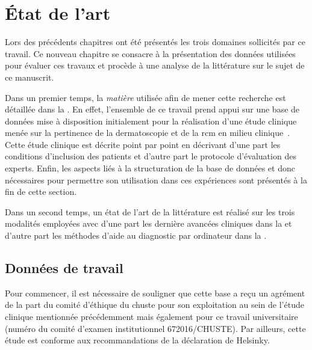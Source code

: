 \chapter{État de l'art}
\label{chap:chapter_31}
\chapterintro
Lors des précédents chapitres ont été présentés les trois domaines sollicités par ce travail. Ce nouveau chapitre se consacre à la présentation des données utilisées pour évaluer ces travaux et procède à une analyse de la littérature sur le sujet de ce manuscrit.\par

Dans un premier temps, la \textit{matière} utilisée afin de mener cette recherche est détaillée dans la . En effet, l'ensemble de ce travail prend appui sur une base de données mise à disposition initialement pour la réalisation d'une étude clinique menée sur la pertinence de la dermatoscopie et de la \acrlong{rcm} en milieu clinique~\cite{Cinotti2018}. Cette étude clinique est décrite point par point en décrivant d'une part les conditions d'inclusion des patients et d'autre part le protocole d'évaluation des experts. Enfin, les aspects liés à la structuration de la base de données et donc nécessaires pour permettre son utilisation dans ces expériences sont présentés à la fin de cette section.\par

Dans un second temps, un état de l'art de la littérature est réalisé sur les trois modalités employées avec d'une part les dernière avancées cliniques dans la  et d'autre part les méthodes d'aide au diagnostic par ordinateur dans la .\par
\newpage

\section{Données de travail}
\label{sec:clinical_data}
Pour commencer, il est nécessaire de souligner que cette base a reçu un agrément de la part du comité d'éthique du \acrfull{chuste} pour son exploitation au sein de l'étude clinique mentionnée précédemment mais également pour ce travail universitaire (numéro du comité d'examen institutionnel 672016/CHUSTE). Par ailleurs, cette étude est conforme aux recommandations de la déclaration de Helsinky.\par

